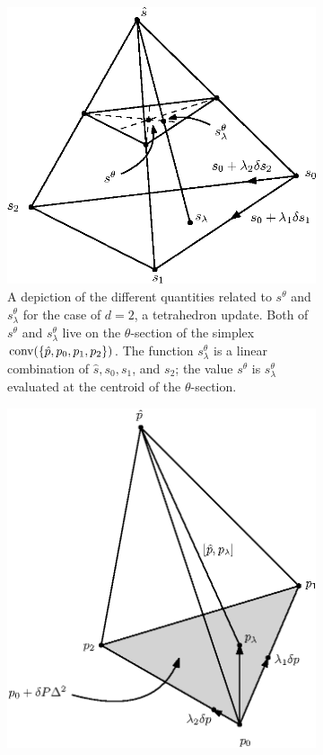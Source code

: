 \documentclass[smallcondensed]{svjour3}
\begin{document}
\begin{figure}
  \centering
  \begin{subfigure}{.5\textwidth}
    \centering
    \includegraphics[width=0.95\linewidth]{slowness-tetra.eps}
    \caption{A depiction of the different quantities related to
      $s^{\theta}$ and $s^{\theta}_\lambda$ for the case of $d = 2$, a
      tetrahedron update. Both of $s^\theta$ and $s^\theta_\lambda$ live
      on the $\theta$-section of the simplex
      $\operatorname{conv}(\left\{\hat{p}, p_0, p_1, p_2\right\})$. The function
      $s^\theta_\lambda$ is a linear combination of $\hat{s}, s_0, s_1$,
      and $s_2$; the value $s^\theta$ is $s^\theta_\lambda$ evaluated at
      the centroid of the $\theta$-section.}\label{fig:slowness-tetra}
  \end{subfigure}%
  \hspace{.05\linewidth}
  \begin{subfigure}{.44\textwidth}
    \centering
    \includegraphics[width=0.95\linewidth]{simplex-diagram.eps}

\end{subfigure}
\end{figure}
\end{document}
